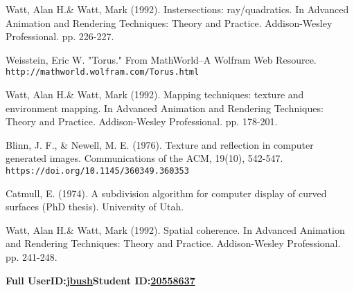 \documentclass {article}
\begin{document}
\begin{description}
\begin{thebibliography}{9}
Watt, Alan H.\& Watt, Mark (1992). Instersections: ray/quadratics. In Advanced Animation and Rendering Techniques: Theory and Practice. Addison-Wesley Professional. pp. 226-227.

Weisstein, Eric W. "Torus." From MathWorld--A Wolfram Web Resource.\\ \texttt{http://mathworld.wolfram.com/Torus.html}

Watt, Alan H.\& Watt, Mark (1992). Mapping techniques: texture and environment mapping. In Advanced Animation and Rendering Techniques: Theory and Practice. Addison-Wesley Professional. pp. 178-201.

Blinn, J. F., \& Newell, M. E. (1976). Texture and reflection in computer generated images. Communications of the ACM, 19(10), 542-547. \texttt{https://doi.org/10.1145/360349.360353}

Catmull, E. (1974). A subdivision algorithm for computer display of curved surfaces (PhD thesis). University of Utah.

Watt, Alan H.\& Watt, Mark (1992). Spatial coherence. In Advanced Animation and Rendering Techniques: Theory and Practice. Addison-Wesley Professional. pp. 241-248.




\end{thebibliography}
\endgroup

\end{description}
\newpage



{\hfill{\bf Full UserID:\hspace{0.2in}\underline{\hspace{0.5in}jbush\hspace{0.5in}}}\hfill{\bf Student ID:\hspace{0.2in}\underline{\hspace{0.4in}20558637\hspace{0.4in}}}\hfill}
\end{document}
